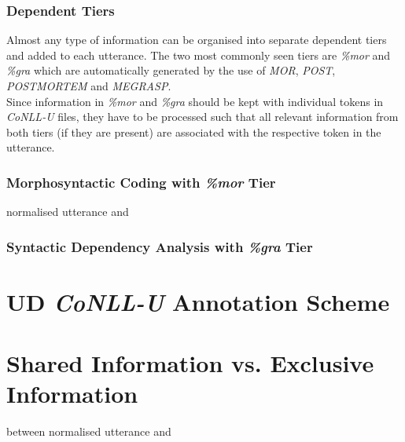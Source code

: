 \subsubsection{Dependent Tiers}
Almost any type of information can be organised into separate dependent tiers
and added to each utterance. The two most commonly seen tiers are \emph{\%mor}
and \emph{\%gra} which are automatically generated by the use of \emph{MOR},
\emph{POST}, \emph{POSTMORTEM} and \emph{MEGRASP}.\\
Since information in \emph{\%mor} and \emph{\%gra} should be kept with
individual tokens in \emph{CoNLL-U} files, they have to be processed such that
all relevant information from both tiers (if they are present) are associated
with the respective token in the utterance.
\subsubsection{Morphosyntactic Coding with \emph{\%mor} Tier}
normalised utterance and %

\subsubsection{Syntactic Dependency Analysis with \emph{\%gra} Tier}

\section{UD \emph{CoNLL-U} Annotation Scheme}

\section{Shared Information vs. Exclusive Information}
between normalised utterance and %
